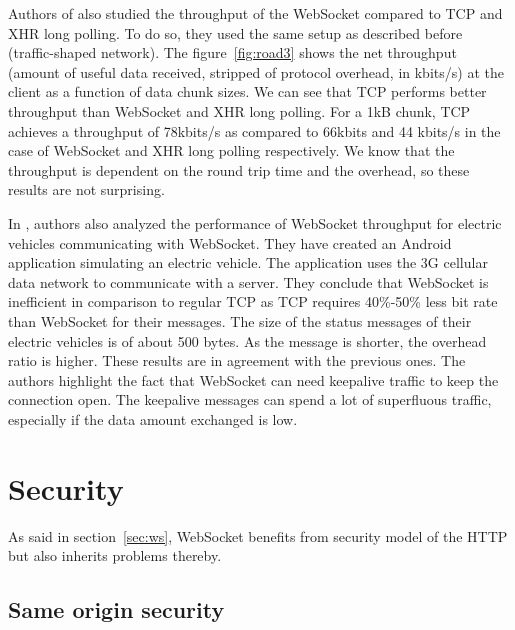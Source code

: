 \documentclass[10pt,journal,compsoc]{IEEEtran}
\newcommand{\ws}{WebSocket}
\begin{document}
Authors of \cite{roadblock} also studied the throughput of the \ws{} compared to TCP and XHR long polling.
To do so, they used the same setup as described before (traffic-shaped network).
The figure~\ref{fig:road3} shows the net throughput (amount of useful data received, stripped of protocol overhead, in kbits/s) at the client as a function of data chunk sizes.
We can see that TCP performs better throughput than \ws{} and XHR long polling.
For a 1kB chunk, TCP achieves a throughput of 78kbits/s as compared to 66kbits and 44 kbits/s in the case of \ws{} and XHR long polling respectively.
We know that the throughput is dependent on the round trip time and the overhead, so these results are not surprising.

In \cite{EV}, authors also analyzed the performance of \ws{} throughput for electric vehicles communicating with \ws{}.
They have created an Android application simulating an electric vehicle.
The application uses the 3G cellular data network to communicate with a server.
They conclude that \ws{} is inefficient in comparison to regular TCP as TCP requires 40\%-50\% less bit rate than \ws{} for their messages.
The size of the status messages of their electric vehicles is of about 500 bytes. 
As the message is shorter, the overhead ratio is higher.
These results are in agreement with the previous ones.
The authors highlight the fact that \ws{} can need keepalive traffic to keep the connection open.
The keepalive messages can spend a lot of superfluous traffic, especially if the data amount exchanged is low.


\section{Security}

As said in section~\ref{sec:ws}, \ws{} benefits from security model of the HTTP but also inherits problems thereby.

\subsection{Same origin security}
\end{document}
